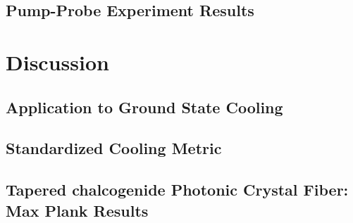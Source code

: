 \subsection{Pump-Probe Experiment Results}
\label{subsec:Cooling:Results:Pump-Probe}


\section{Discussion}
\label{sec:Cooling:Discussion}


\subsection{Application to Ground State Cooling}
\label{subsec:Cooling:Discussion:Ground-State}


\subsection{Standardized Cooling Metric}
\label{subsec:Cooling:Discussion:Metric}


\subsection{Tapered chalcogenide Photonic Crystal Fiber: Max Plank Results}
\label{subsec:Cooling:Discussion:Max-Plank}
